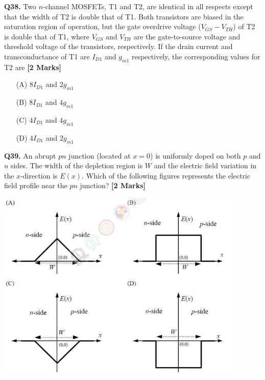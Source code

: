 \documentclass[11pt]{article}
\newcommand{\questionb}[2]{
    \noindent\textbf{Q#2.} #1 \hfill \textbf{[2 Marks]}
}
\begin{document}
\questionb{Two $n$-channel MOSFETs, T1 and T2, are identical in all respects except that the width of T2 is double that of T1. Both transistors are biased in the saturation region of operation, but the gate overdrive voltage ($V_{GS} - V_{TH}$) of T2 is double that of T1, where $V_{GS}$ and $V_{TH}$ are the gate-to-source voltage and threshold voltage of the transistors, respectively. If the drain current and transconductance of T1 are $I_{D1}$ and $g_{m1}$ respectively, the corresponding values for T2 are}{38}
\begin{enumerate}
    \item[(A)] $8I_{D1}$ and $2g_{m1}$
    \item[(B)] $8I_{D1}$ and $4g_{m1}$
    \item[(C)] $4I_{D1}$ and $4g_{m1}$
    \item[(D)] $4I_{D1}$ and $2g_{m1}$
\end{enumerate}

\vspace{0.5cm}

\questionb{An abrupt $pn$ junction (located at $x = 0$) is uniformly doped on both $p$ and $n$ sides. The width of the depletion region is $W$ and the electric field variation in the $x$-direction is $E(x)$. Which of the following figures represents the electric field profile near the $pn$ junction?}{39}
\begin{center}
\includegraphics[width=0.9\textwidth]{figures/39.png}
\end{center}

\vspace{0.5cm}
\end{document}
